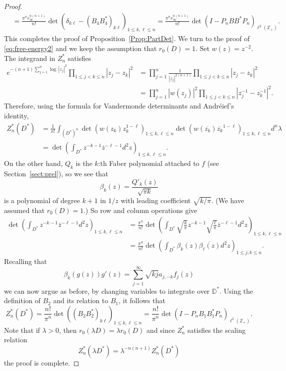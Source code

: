 \documentclass{article}
\numberwithin{equation}{section}
\numberwithin{figure}{section}
\theoremstyle{plain}
\theoremstyle{plain}
\numberwithin{thm}{section}
\theoremstyle{remark}
\newcommand{\D}{\mathbb{D}}
\newcommand{\Z}{\mathbb{Z}}
\let \le \leqslant
\begin{document}
\begin{proof}
\begin{align*}
&=\frac{\pi^n r_\infty^{n(n+1)}}{n!}\det\left(\delta_{k\ell}-(B_4B_4^*)_{k\ell}\right)_{1\le k,\ell\le n}=\frac{\pi^n r_\infty^{n(n+1)}}{n!}\det(I-P_nBB^*P_n)_{\ell^2(\Z_+)}.
\end{align*}
This completes the proof of Proposition~\ref{Prop:PartDet}.
We turn to the proof of \eqref{eq:free-energy2} and we keep the assumption that $r_0(D) = 1$.
Set $w(z) = z^{-2}$. The integrand in $Z_n^*$ satisfies
  \begin{align*}
  e^{-(n+1) \sum_{j=1}^n\log \, |z_j|^2} \prod_{1 \le j < k \le n}|z_j-z_k|^2 & = \prod_{j = 1}^n \frac{1}{|z_j|^{2(n+1)}} \prod_{1 \le j < k \le n}|z_j-z_k|^2 \\
  & = \prod_{j=1}^n|w(z_j)|^2 \prod_{1 \le j < k \le n}|z_j^{-1}-z_k^{-1}|^2.
  \end{align*}
Therefore, using the formula for Vandermonde determinants and Andr\'eief's identity,
\begin{align*}
Z_n^*(D^*) & =  \frac{1}{n!}\int_{(D^*)^n} \det(w(z_k)z_k^{1-\ell})_{1\le k,\ell \le n} \det(w(\overline{z_k})  \overline{z_k}^{1-\ell})_{1\le k,\ell \le n}d^n \lambda  \\&  =  \det \left( \int_{D^*} z^{-k-1} \overline{z}^{-\ell-1} d^2z \right)_{1 \le k, \ell \le n}.
\end{align*}
On the other hand,  $Q_k$ is the $k$:th Faber polynomial attached to $f$  (see Section~\ref{sect:prel}), so we see that
\[
 \beta_k(z) = \frac{Q'_k(z)}{\sqrt{\pi k}}\]
 is a polynomial of degree $k+1$ in $1/z$ with leading coefficient $\sqrt{k/\pi}$. (We have assumed that $r_0(D) = 1$.) So row and column operations give
  \begin{align*}
  \det \left( \int_{D^*} z^{-k-1} \overline{z}^{-\ell-1} d^2z \right)_{1 \le k, \ell \le n} & = \frac{\pi^n}{n!}  \det \left( \int_{D^*} \sqrt{\frac{k}{\pi}}z^{-k-1} \sqrt{\frac{\ell}{\pi}} \overline{z}^{-\ell-1} d^2z \right)_{1 \le k, \ell \le n} \\
  & = \frac{\pi^n}{n!} \det \left(\int_{D^*} \beta_k(z) \overline{\beta_\ell(z)} d^2z\right)_{1 \le j,k \le n}.
  \end{align*}
Recalling that
  \[
  \beta_k( g(z)) g'(z) =  \sum_{j=1}^\infty \sqrt{kj} a_{j,-k} f_j(z)
   \]
we can now argue as before, by changing variables to integrate over $\D^*$. Using the definition of  $B_2$ and its relation to $B_1$, it follows that
\[
Z_n^*(D^*) = \frac{n!}{\pi^n} \det((B_2B_2^*)_{k\ell})_{1 \le k, \ell \le n} = \frac{n!}{\pi^n} \det(I - P_nB_1B_1^*P_n)_{\ell^2(\Z_+)}.
\]
Note that if $\lambda > 0$, then $r_0(\lambda D) = \lambda r_0(D)$ and since $Z_n^*$ satisfies the scaling relation
\[
Z_n^*(\lambda D^*) = \lambda^{-n(n+1)}Z_n^*(D^*)
\]
the proof is complete.
    \end{proof}
\end{document}

